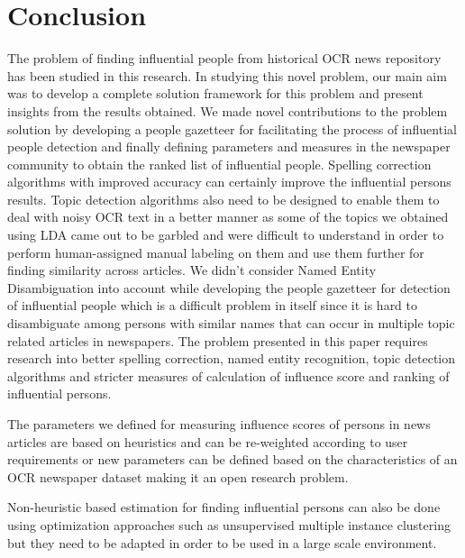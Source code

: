 \documentclass[10pt,journal,compsoc]{IEEEtran}
\begin{document}
\section{Conclusion}

The problem of finding influential people from historical OCR news repository has been studied in this research. In studying this novel problem, our main aim was to develop a complete solution framework for this problem and present insights from the results obtained.
 We made novel contributions to the problem solution by developing a people gazetteer for facilitating the process of influential people detection and finally defining parameters and measures in the newspaper community to obtain the ranked list of influential people.
Spelling correction algorithms with improved accuracy can certainly improve the influential persons results.
Topic detection algorithms also need to be designed to enable them to deal with noisy OCR text in a better manner as some of the topics we obtained using LDA came out to be garbled and were difficult to understand in order to perform human-assigned manual labeling on them and use them further for finding similarity across articles.
We didn't consider Named Entity Disambiguation into account while developing the people gazetteer for detection of influential people which is a difficult problem in itself since it is hard to disambiguate among persons with similar names that can occur in multiple topic related articles in newspapers. The problem presented in this paper requires research into better spelling correction, named entity recognition, topic detection algorithms and stricter measures of calculation of influence score and ranking of influential persons.

 The parameters we defined for measuring influence scores of persons in news articles are based on heuristics and can be re-weighted according to user requirements or new parameters can be defined based on the characteristics of an OCR newspaper dataset making it an open research problem.

Non-heuristic based estimation for finding influential persons can also be done using optimization approaches such as unsupervised multiple instance clustering\cite{zhang2009m3ic}\cite{zhang2009multi} but they need to be adapted in order to be used in a large scale environment.

\end{document}
